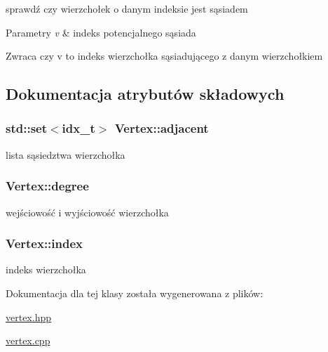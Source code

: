 sprawdź czy wierzchołek o danym indeksie jest sąsiadem 


\begin{DoxyParams}{Parametry}
{\em v} & indeks potencjalnego sąsiada\\
\hline
\end{DoxyParams}
\begin{DoxyReturn}{Zwraca}
czy v to indeks wierzchołka sąsiadującego z danym wierzchołkiem 
\end{DoxyReturn}


\subsection{Dokumentacja atrybutów składowych}
\hypertarget{classVertex_a47b4f2e131ebb0bc19d9765032b14bbe}{
\subsubsection[{adjacent}]{\setlength{\rightskip}{0pt plus 5cm}std\-::set$<${\bf idx\-\_\-t}$>$ Vertex\-::adjacent\hspace{0.3cm}{\ttfamily [private]}}}\label{classVertex_a47b4f2e131ebb0bc19d9765032b14bbe}


lista sąsiedztwa wierzchołka 

\hypertarget{classVertex_ac1a6f322618b6d221822bc047b26ceea}{
\subsubsection[{degree}]{ Vertex\-::degree\hspace{0.3cm}{\ttfamily [private]}}}\label{classVertex_ac1a6f322618b6d221822bc047b26ceea}


wejściowość i wyjściowość wierzchołka 

\hypertarget{classVertex_aa614f5224115d0d25abc2f8073b41758}{
\subsubsection[{index}]{ Vertex\-::index\hspace{0.3cm}{\ttfamily [private]}}}\label{classVertex_aa614f5224115d0d25abc2f8073b41758}


indeks wierzchołka 



Dokumentacja dla tej klasy została wygenerowana z plików\-:\begin{DoxyCompactItemize}
\item 
\hyperlink{vertex_8hpp}{vertex.\-hpp}\item 
\hyperlink{vertex_8cpp}{vertex.\-cpp}\end{DoxyCompactItemize}
